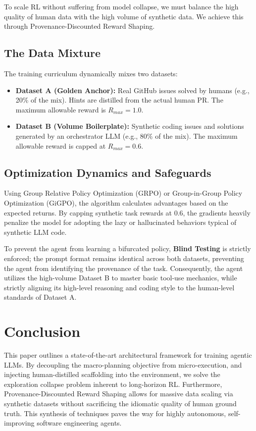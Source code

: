 \documentclass[10pt, letterpaper]{article}
\begin{document}
To scale RL without suffering from model collapse, we must balance the high quality of human data with the high volume of synthetic data. We achieve this through Provenance-Discounted Reward Shaping.

\subsection{The Data Mixture}
The training curriculum dynamically mixes two datasets:
\begin{itemize}
    \item \textbf{Dataset A (Golden Anchor):} Real GitHub issues solved by humans (e.g., 20\% of the mix). Hints are distilled from the actual human PR. The maximum allowable reward is $R_{max} = 1.0$.
    \item \textbf{Dataset B (Volume Boilerplate):} Synthetic coding issues and solutions generated by an orchestrator LLM (e.g., 80\% of the mix). The maximum allowable reward is capped at $R_{max} = 0.6$.
\end{itemize}

\subsection{Optimization Dynamics and Safeguards}
Using Group Relative Policy Optimization (GRPO) or Group-in-Group Policy Optimization (GiGPO), the algorithm calculates advantages based on the expected returns. By capping synthetic task rewards at $0.6$, the gradients heavily penalize the model for adopting the lazy or hallucinated behaviors typical of synthetic LLM code.

To prevent the agent from learning a bifurcated policy, \textbf{Blind Testing} is strictly enforced; the prompt format remains identical across both datasets, preventing the agent from identifying the provenance of the task. Consequently, the agent utilizes the high-volume Dataset B to master basic tool-use mechanics, while strictly aligning its high-level reasoning and coding style to the human-level standards of Dataset A.

\section{Conclusion}

This paper outlines a state-of-the-art architectural framework for training agentic LLMs. By decoupling the macro-planning objective from micro-execution, and injecting human-distilled scaffolding into the environment, we solve the exploration collapse problem inherent to long-horizon RL. Furthermore, Provenance-Discounted Reward Shaping allows for massive data scaling via synthetic datasets without sacrificing the idiomatic quality of human ground truth. This synthesis of techniques paves the way for highly autonomous, self-improving software engineering agents.
\end{document}
